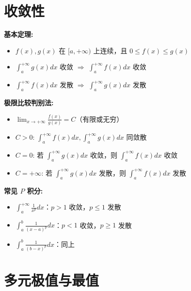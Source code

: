 \documentclass[10pt]{article}
\begin{document}
\newpage
\begin{multicols*}{2}
\raggedcolumns


\section*{收敛性}
\vspace{-8pt}

\textbf{基本定理:}
\begin{itemize}
  \item \(f(x), g(x)\) 在 \([a,+\infty)\) 上连续，且 \(0 \leq f(x) \leq g(x)\)
  \item \(\int_a^{+\infty} g(x)dx\) 收敛 \(\Rightarrow\) \(\int_a^{+\infty} f(x)dx\) 收敛
  \item \(\int_a^{+\infty} f(x)dx\) 发散 \(\Rightarrow\) \(\int_a^{+\infty} g(x)dx\) 发散
\end{itemize}

\textbf{极限比较判别法:}
\begin{itemize}
  \item \(\lim_{x \to +\infty} \frac{f(x)}{g(x)} = C\)（有限或无穷）
  \item \(C > 0\): \(\int_a^{+\infty} f(x)dx, \int_a^{+\infty} g(x)dx\) 同敛散
  \item \(C = 0\): 若 \(\int_a^{+\infty} g(x)dx\) 收敛，则 \(\int_a^{+\infty} f(x)dx\) 收敛
  \item \(C = +\infty\): 若 \(\int_a^{+\infty} g(x)dx\) 发散，则 \(\int_a^{+\infty} f(x)dx\) 发散
\end{itemize}

\textbf{常见 \(P\) 积分:}
\begin{itemize}
  \item \(\int_a^{+\infty} \frac{1}{x^p}dx\)：\(p > 1\) 收敛，\(p \leq 1\) 发散
  \item \(\int_a^b \frac{1}{(x - a)^p}dx\)：\(p < 1\) 收敛，\(p \geq 1\) 发散
  \item \(\int_a^b \frac{1}{(b - x)^p}dx\)：同上
\end{itemize}

\section*{多元极值与最值}
\vspace{-8pt}


\end{multicols*}
\end{document}
